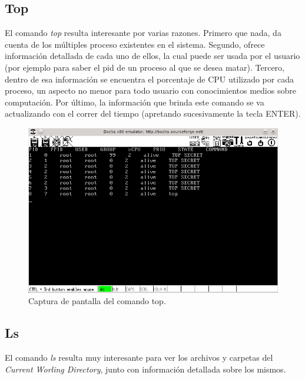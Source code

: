 \documentclass[a4paper,10pt]{article}
\begin{document}
      \subsection{Top}
      El comando \textit{top} resulta interesante por varias razones. Primero que nada, da cuenta de los múltiples proceso existentes en el sistema. Segundo, 
      ofrece información detallada de cada uno de ellos, la cual puede ser usada por el usuario (por ejemplo para saber el pid de un proceso al que se desea matar).
      Tercero, dentro de esa información se encuentra el porcentaje de CPU utilizado por cada proceso, un aspecto no menor para todo usuario con conocimientos medios
      sobre computación. Por último, la información que brinda este comando se va actualizando con el correr del tiempo (apretando sucesivamente la tecla ENTER).
      
      \begin{figure}[H]
	\begin{center}
	\includegraphics[scale=0.65]{./images/top.png}
	 \caption{Captura de pantalla del comando top.}
	\end{center}
      \end{figure}

      \subsection{Ls}
      El comando \textit{ls} resulta muy interesante para ver los archivos y carpetas del \textit{Current Worling Directory}, junto con información detallada sobre los mismos.
\end{document}
